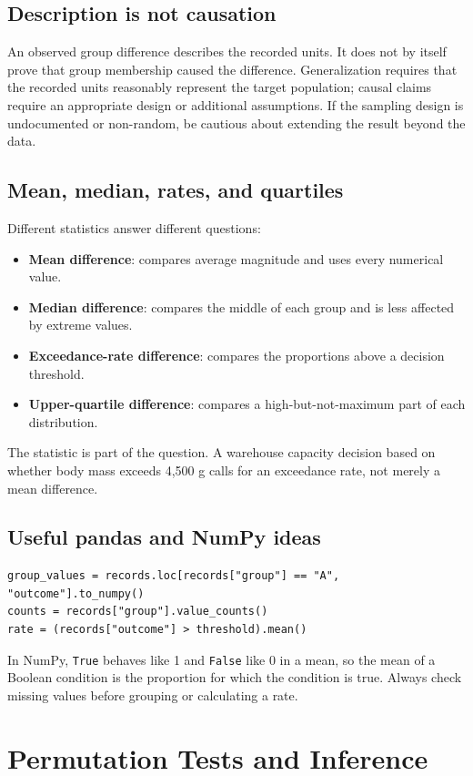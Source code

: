 \documentclass[11pt]{article}
\begin{document}
\subsection{Description is not causation}
An observed group difference describes the recorded units. It does not by itself prove that group membership caused the difference. Generalization requires that the recorded units reasonably represent the target population; causal claims require an appropriate design or additional assumptions. If the sampling design is undocumented or non-random, be cautious about extending the result beyond the data.

\subsection{Mean, median, rates, and quartiles}
Different statistics answer different questions:
\begin{itemize}
	\item \textbf{Mean difference}: compares average magnitude and uses every numerical value.
	\item \textbf{Median difference}: compares the middle of each group and is less affected by extreme values.
	\item \textbf{Exceedance-rate difference}: compares the proportions above a decision threshold.
	\item \textbf{Upper-quartile difference}: compares a high-but-not-maximum part of each distribution.
\end{itemize}
The statistic is part of the question. A warehouse capacity decision based on whether body mass exceeds 4,500 g calls for an exceedance rate, not merely a mean difference.

\subsection{Useful pandas and NumPy ideas}
\begin{lstlisting}
group_values = records.loc[records["group"] == "A", "outcome"].to_numpy()
counts = records["group"].value_counts()
rate = (records["outcome"] > threshold).mean()
\end{lstlisting}
In NumPy, \texttt{True} behaves like 1 and \texttt{False} like 0 in a mean, so the mean of a Boolean condition is the proportion for which the condition is true. Always check missing values before grouping or calculating a rate.

\section{Permutation Tests and Inference}
\end{document}

